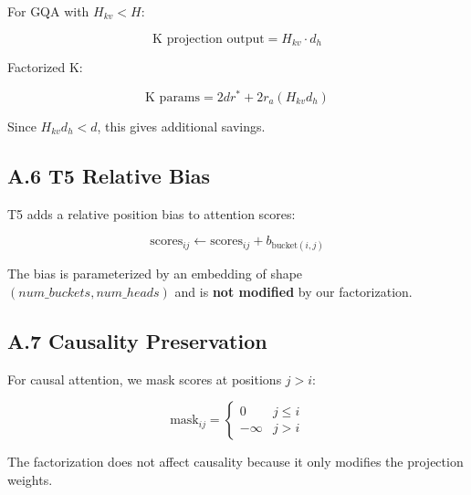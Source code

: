 For GQA with $H_{kv} < H$:

\begin{equation}
\text{K projection output} = H_{kv} \cdot d_h
\end{equation}

Factorized K:

\begin{equation}
\text{K params} = 2 d r^* + 2 r_a (H_{kv} d_h)
\end{equation}

Since $H_{kv} d_h < d$, this gives additional savings.

\subsection{A.6 T5 Relative Bias}

T5 adds a relative position bias to attention scores:

\begin{equation}
\text{scores}_{ij} \leftarrow \text{scores}_{ij} + b_{\text{bucket}(i, j)}
\end{equation}

The bias is parameterized by an embedding of shape $(num\_buckets, num\_heads)$ 
and is \textbf{not modified} by our factorization.

\subsection{A.7 Causality Preservation}

For causal attention, we mask scores at positions $j > i$:

\begin{equation}
\text{mask}_{ij} = \begin{cases} 0 & j \leq i \\ -\infty & j > i \end{cases}
\end{equation}

The factorization does not affect causality because it only modifies the 
projection weights.

